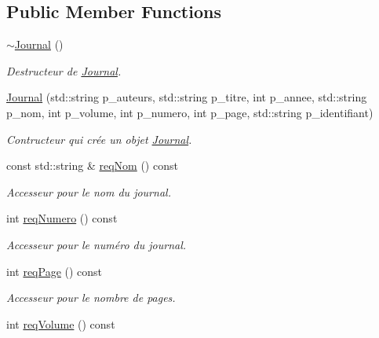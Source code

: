 \subsection*{Public Member Functions}
\begin{DoxyCompactItemize}
\item 
\hyperlink{classbiblio_1_1Journal_a0cb817e268b129cb1732ad8c4c2a9ccb}{$\sim$\+Journal} ()\hypertarget{classbiblio_1_1Journal_a0cb817e268b129cb1732ad8c4c2a9ccb}{}\label{classbiblio_1_1Journal_a0cb817e268b129cb1732ad8c4c2a9ccb}

\begin{DoxyCompactList}\small\item\em Destructeur de \hyperlink{classbiblio_1_1Journal}{Journal}. \end{DoxyCompactList}\item 
\hyperlink{classbiblio_1_1Journal_a83f03a7808ad679bdcaff8382c2ce718}{Journal} (std\+::string p\+\_\+auteurs, std\+::string p\+\_\+titre, int p\+\_\+annee, std\+::string p\+\_\+nom, int p\+\_\+volume, int p\+\_\+numero, int p\+\_\+page, std\+::string p\+\_\+identifiant)
\begin{DoxyCompactList}\small\item\em Contructeur qui crée un objet \hyperlink{classbiblio_1_1Journal}{Journal}. \end{DoxyCompactList}\item 
const std\+::string \& \hyperlink{classbiblio_1_1Journal_a224c3798a810bf334a47d3da1d58e42d}{req\+Nom} () const 
\begin{DoxyCompactList}\small\item\em Accesseur pour le nom du journal. \end{DoxyCompactList}\item 
int \hyperlink{classbiblio_1_1Journal_ab56f3828f03efefd102da330e3a0e543}{req\+Numero} () const 
\begin{DoxyCompactList}\small\item\em Accesseur pour le numéro du journal. \end{DoxyCompactList}\item 
int \hyperlink{classbiblio_1_1Journal_a7ed8914d6af79adf1d973665c544ea7d}{req\+Page} () const 
\begin{DoxyCompactList}\small\item\em Accesseur pour le nombre de pages. \end{DoxyCompactList}\item 
int \hyperlink{classbiblio_1_1Journal_a3a2d883971b4cc88754d20498f64a968}{req\+Volume} () const 

\end{DoxyCompactItemize}
